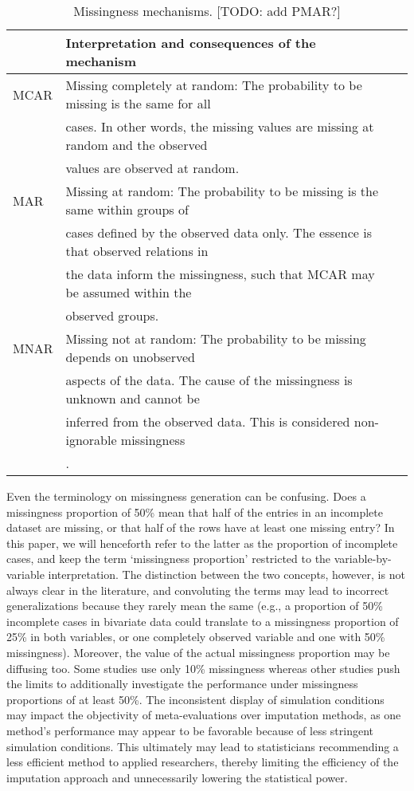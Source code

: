 \documentclass[bimj,fleqn]{w-art}
\begin{document}
\begin{table}[tb]
\begin{center}
\caption{Missingness mechanisms. [TODO: add PMAR?]}
\label{table:mech}
\begin{tabular}{lll}
\hline
      & Interpretation and consequences of the mechanism \\
\hline  
MCAR  & Missing completely at random: The probability to be missing is the same for all \\
      & cases. In other words, the missing values are missing at random and the observed \\
      & values are observed at random. \\
MAR   & Missing at random: The probability to be missing is the same within groups of \\
      & cases defined by the observed data only. The essence is that observed relations in \\
      & the data inform the missingness, such that MCAR may be assumed within the \\ 
      & observed groups. \\
MNAR  & Missing not at random: The probability to be missing depends on unobserved \\
      & aspects of the data. The cause of the missingness is unknown and cannot be \\ 
      & inferred from the observed data. This is considered non-ignorable missingness \\
      & \citep[see e.g.][]{rubi76}. \\
\hline
\end{tabular}
\end{center}
\end{table}

Even the terminology on missingness generation can be confusing. Does a missingness proportion of 50\% mean that half of the entries in an incomplete dataset are missing, or that half of the rows have at least one missing entry? In this paper, we will henceforth refer to the latter as the proportion of incomplete cases, and keep the term `missingness proportion' restricted to the variable-by-variable interpretation. The distinction between the two concepts, however, is not always clear in the literature, and convoluting the terms may lead to incorrect generalizations because they rarely mean the same (e.g., a proportion of 50\% incomplete cases in bivariate data could translate to a missingness proportion of 25\% in both variables, or one completely observed variable and one with 50\% missingness). Moreover, the value of the actual missingness proportion may be diffusing too. Some studies use only 10\% missingness whereas other studies push the limits to additionally investigate the performance under missingness proportions of at least 50\%. The inconsistent display of simulation conditions may impact the objectivity of meta-evaluations over imputation methods, as one method's performance may appear to be favorable because of less stringent simulation conditions. This ultimately may lead to statisticians recommending a less efficient method to applied researchers, thereby limiting the efficiency of the imputation approach and unnecessarily lowering the statistical power.
\end{document}
